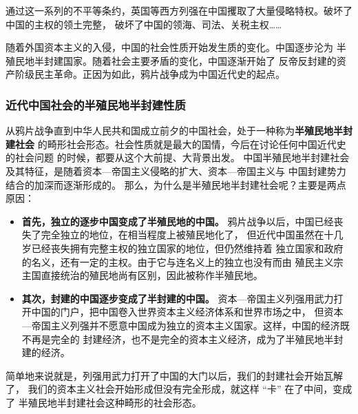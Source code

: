 \documentclass[10pt, UTF8]{book} %
\begin{document}
通过这一系列的不平等条约，英国等西方列强在中国攫取了大量侵略特权。破坏了中国的主权的领土完整，
破坏了中国的领海、司法、关税主权……

随着外国资本主义的入侵，中国的社会性质开始发生质的变化。中国逐步沦为
半殖民地半封建国家。随着社会主要矛盾的变化，中国逐渐开始了
反帝反封建的资产阶级民主革命。正因为如此，鸦片战争成为中国近代史的起点。

\subsubsection{近代中国社会的半殖民地半封建性质}

从鸦片战争直到中华人民共和国成立前夕的中国社会，处于一种称为\textbf{半殖民地半封建社会}
的畸形社会形态。社会性质就是最大的国情，今后在讨论任何中国近代史的社会问题
的时候，都要从这个大前提、大背景出发。
中国半殖民地半封建社会及其特征，是随着资本—帝国主义侵略的扩大、资本—帝国主义与
中国封建势力结合的加深而逐渐形成的。
那么，为什么是半殖民地半封建社会呢？主要是两点原因：
\begin{itemize}[itemsep=0pt]
    \item \textbf{首先，独立的逐步中国变成了半殖民地的中国。}
    鸦片战争以后，中国已经丧失了完全独立的地位，在相当程度上被殖民地化了，
    但近代中国虽然在十几岁已经丧失拥有完整主权的独立国家的地位，但仍然维持着
    独立国家和政府的名义，还有一定的主权。由于它与连名义上的独立也没有而由
    殖民主义宗主国直接统治的殖民地尚有区别，因此被称作半殖民地。
    
    \item \textbf{其次，封建的中国逐步变成了半封建的中国。}
    资本—帝国主义列强用武力打开中国的门户，把中国卷入世界资本主义经济体系和世界市场之中，
    但资本—帝国主义列强并不愿意中国成为独立的资本主义国家。这样，中国的经济既不再是完全的
    封建经济，也不是完全的资本主义经济，成为了半殖民地半封建的经济。
\end{itemize}
简单地来说就是，列强用武力打开了中国的大门以后，我们的封建社会开始瓦解了，
我们的资本主义社会开始形成但没有完全形成，就这样 “卡” 在了中间，变成了
半殖民地半封建社会这种畸形的社会形态。
\end{document}

